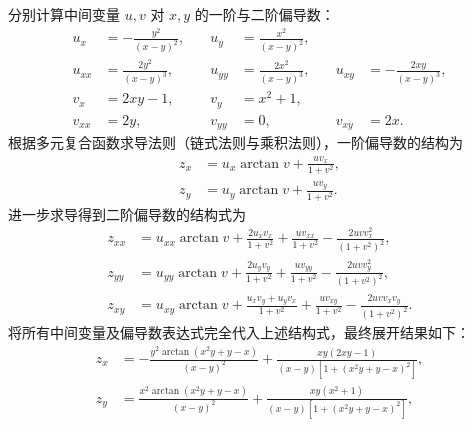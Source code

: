 \begin{solution}
    分别计算中间变量 $u, v$ 对 $x, y$ 的一阶与二阶偏导数：
    \begin{equation}
        \begin{aligned}
            u_x    & = -\frac{y^2}{(x-y)^2}, \quad & u_y    & = \frac{x^2}{(x-y)^2},                                           \\
            u_{xx} & = \frac{2y^2}{(x-y)^3}, \quad & u_{yy} & = \frac{2x^2}{(x-y)^3}, \quad & u_{xy} & = -\frac{2xy}{(x-y)^3}, \\
            v_x    & = 2xy - 1, \quad              & v_y    & = x^2 + 1,                                                       \\
            v_{xx} & = 2y, \quad                   & v_{yy} & = 0, \quad                    & v_{xy} & = 2x.
        \end{aligned}
    \end{equation}
    根据多元复合函数求导法则（链式法则与乘积法则），一阶偏导数的结构为
    \begin{equation}
        \begin{aligned}
            z_x & = u_x \arctan v + \frac{u v_x}{1+v^2}, \\
            z_y & = u_y \arctan v + \frac{u v_y}{1+v^2}.
        \end{aligned}
    \end{equation}
    进一步求导得到二阶偏导数的结构式为
    \begin{equation}
        \begin{aligned}
            z_{xx} & = u_{xx} \arctan v + \frac{2 u_x v_x}{1+v^2} + \frac{u v_{xx}}{1+v^2} - \frac{2 u v v_x^2}{(1+v^2)^2},           \\
            z_{yy} & = u_{yy} \arctan v + \frac{2 u_y v_y}{1+v^2} + \frac{u v_{yy}}{1+v^2} - \frac{2 u v v_y^2}{(1+v^2)^2},           \\
            z_{xy} & = u_{xy} \arctan v + \frac{u_x v_y + u_y v_x}{1+v^2} + \frac{u v_{xy}}{1+v^2} - \frac{2 u v v_x v_y}{(1+v^2)^2}.
        \end{aligned}
    \end{equation}
    将所有中间变量及偏导数表达式完全代入上述结构式，最终展开结果如下：
    \begin{equation}
        \boxed{
            \begin{aligned}
                z_x    & = -\frac{y^2 \arctan(x^2y+y-x)}{(x-y)^2} + \frac{xy(2xy-1)}{(x-y)[1+(x^2y+y-x)^2]},                         \\
                z_y    & = \frac{x^2 \arctan(x^2y+y-x)}{(x-y)^2} + \frac{xy(x^2+1)}{(x-y)[1+(x^2y+y-x)^2]},                          \\

\end{aligned}}
\end{equation}
\end{solution}
